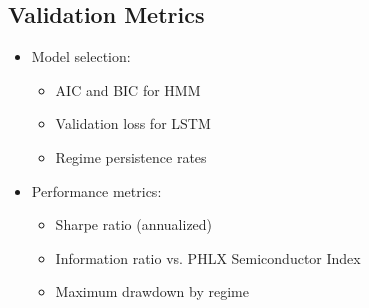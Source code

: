 \subsection{Validation Metrics}
\begin{itemize}
    \item Model selection:
        \begin{itemize}
            \item AIC and BIC for HMM
            \item Validation loss for LSTM
            \item Regime persistence rates
        \end{itemize}
    \item Performance metrics:
        \begin{itemize}
            \item Sharpe ratio (annualized)
            \item Information ratio vs. PHLX Semiconductor Index
            \item Maximum drawdown by regime
        \end{itemize}
\end{itemize}
